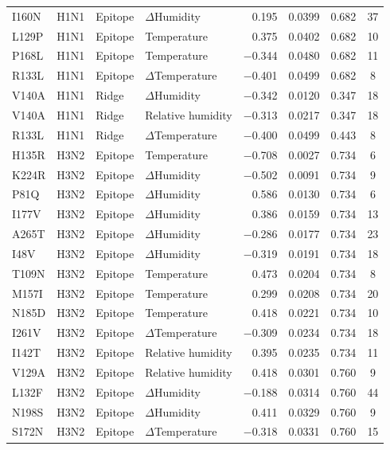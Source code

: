 \documentclass[11pt, a4paper]{article}
\begin{document}
\begin{longtable}{llllrccc}
        I160N & H1N1 & Epitope & $\Delta$Humidity & 0.195 & 0.0399 & 0.682 & 37 \\
        L129P & H1N1 & Epitope & Temperature & 0.375 & 0.0402 & 0.682 & 10 \\
        P168L & H1N1 & Epitope & Temperature & $-$0.344 & 0.0480 & 0.682 & 11 \\
        R133L & H1N1 & Epitope & $\Delta$Temperature & $-$0.401 & 0.0499 & 0.682 & 8 \\
        V140A & H1N1 & Ridge & $\Delta$Humidity & $-$0.342 & 0.0120 & 0.347 & 18 \\
        V140A & H1N1 & Ridge & Relative humidity & $-$0.313 & 0.0217 & 0.347 & 18 \\
        R133L & H1N1 & Ridge & $\Delta$Temperature & $-$0.400 & 0.0499 & 0.443 & 8 \\
        H135R & H3N2 & Epitope & Temperature & $-$0.708 & 0.0027 & 0.734 & 6 \\
        K224R & H3N2 & Epitope & $\Delta$Humidity & $-$0.502 & 0.0091 & 0.734 & 9 \\
        P81Q & H3N2 & Epitope & $\Delta$Humidity & 0.586 & 0.0130 & 0.734 & 6 \\
        I177V & H3N2 & Epitope & $\Delta$Humidity & 0.386 & 0.0159 & 0.734 & 13 \\
        A265T & H3N2 & Epitope & $\Delta$Humidity & $-$0.286 & 0.0177 & 0.734 & 23 \\
        I48V & H3N2 & Epitope & $\Delta$Humidity & $-$0.319 & 0.0191 & 0.734 & 18 \\
        T109N & H3N2 & Epitope & Temperature & 0.473 & 0.0204 & 0.734 & 8 \\
        M157I & H3N2 & Epitope & Temperature & 0.299 & 0.0208 & 0.734 & 20 \\
        N185D & H3N2 & Epitope & Temperature & 0.418 & 0.0221 & 0.734 & 10 \\
        I261V & H3N2 & Epitope & $\Delta$Temperature & $-$0.309 & 0.0234 & 0.734 & 18 \\
        I142T & H3N2 & Epitope & Relative humidity & 0.395 & 0.0235 & 0.734 & 11 \\
        V129A & H3N2 & Epitope & Relative humidity & 0.418 & 0.0301 & 0.760 & 9 \\
        L132F & H3N2 & Epitope & $\Delta$Humidity & $-$0.188 & 0.0314 & 0.760 & 44 \\
        N198S & H3N2 & Epitope & $\Delta$Humidity & 0.411 & 0.0329 & 0.760 & 9 \\
        S172N & H3N2 & Epitope & $\Delta$Temperature & $-$0.318 & 0.0331 & 0.760 & 15 \\

\end{longtable}
\end{document}
